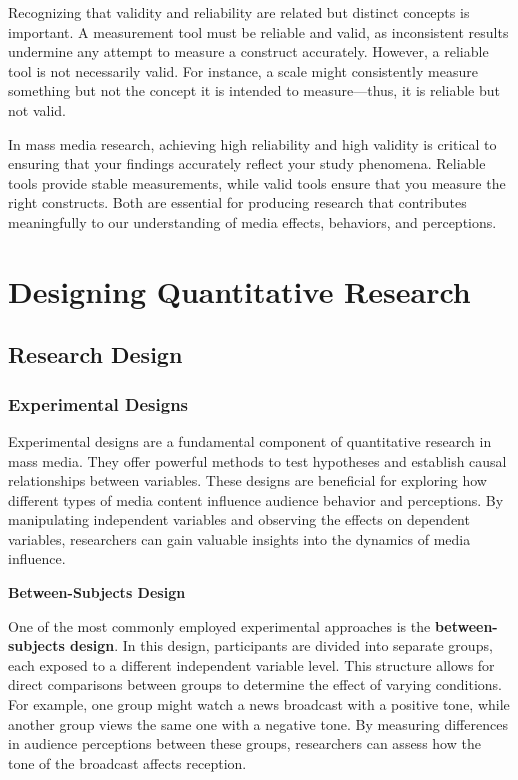 \documentclass[
]{book}
\begin{document}
Recognizing that validity and reliability are related but distinct concepts is important. A measurement tool must be reliable and valid, as inconsistent results undermine any attempt to measure a construct accurately. However, a reliable tool is not necessarily valid. For instance, a scale might consistently measure something but not the concept it is intended to measure---thus, it is reliable but not valid.

In mass media research, achieving high reliability and high validity is critical to ensuring that your findings accurately reflect your study phenomena. Reliable tools provide stable measurements, while valid tools ensure that you measure the right constructs. Both are essential for producing research that contributes meaningfully to our understanding of media effects, behaviors, and perceptions.

\chapter{Designing Quantitative Research}\label{designing-quantitative-research}

\section{Research Design}\label{research-design}

\subsection*{Experimental Designs}\label{experimental-designs}

Experimental designs are a fundamental component of quantitative research in mass media. They offer powerful methods to test hypotheses and establish causal relationships between variables. These designs are beneficial for exploring how different types of media content influence audience behavior and perceptions. By manipulating independent variables and observing the effects on dependent variables, researchers can gain valuable insights into the dynamics of media influence.

\textbf{Between-Subjects Design}

One of the most commonly employed experimental approaches is the \textbf{between-subjects design}. In this design, participants are divided into separate groups, each exposed to a different independent variable level. This structure allows for direct comparisons between groups to determine the effect of varying conditions. For example, one group might watch a news broadcast with a positive tone, while another group views the same one with a negative tone. By measuring differences in audience perceptions between these groups, researchers can assess how the tone of the broadcast affects reception.
\end{document}
